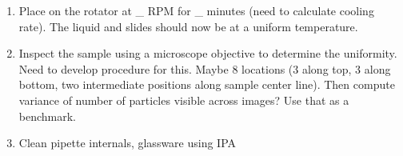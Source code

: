 \begin{enumerate}
        \item Place on the rotator at \_ RPM for \_ minutes (need to calculate cooling rate). The liquid and slides should now be at a uniform temperature.
        \item Inspect the sample using a microscope objective to determine the uniformity. Need to develop procedure for this. Maybe 8 locations (3 along top, 3 along bottom, two intermediate positions along sample center line). Then compute variance of number of particles visible across images? Use that as a benchmark.
        \item Clean pipette internals, glassware using IPA
        
\end{enumerate}